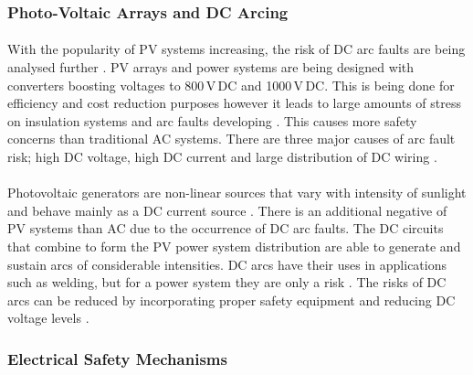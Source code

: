\subsubsection{Photo-Voltaic Arrays and DC Arcing}

\paragraph{}
With the popularity of PV systems increasing, the risk of DC arc faults are being analysed further \cite{Spooner2008}. PV arrays and power systems are being designed with converters boosting voltages to 800\,V\,DC and 1000\,V\,DC. This is being done for efficiency and cost reduction purposes however it leads to large amounts of stress on insulation systems and arc faults developing \cite{Spooner2008}. This causes more safety concerns than traditional AC systems. There are three major causes of arc fault risk; high DC voltage, high DC current and large distribution of DC wiring \cite{website:DC-Arching}.

\paragraph{}
Photovoltaic generators are non-linear sources that vary with intensity of sunlight and behave mainly as a DC current source \cite{Ribeiro2009}. There is an additional negative of PV systems than AC due to the occurrence of DC arc faults. The DC circuits that combine to form the PV power system distribution are able to generate and sustain arcs of considerable intensities. DC arcs have their uses in applications such as welding, but for a power system they are only a risk \cite{Ribeiro2009}. The risks of DC arcs can be reduced by incorporating proper safety equipment and reducing DC voltage levels \cite{Ribeiro2009}.        

\subsubsection{Electrical Safety Mechanisms}

